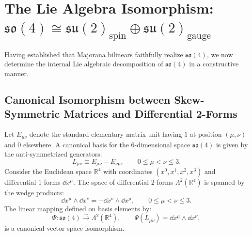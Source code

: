 \section{The Lie Algebra Isomorphism: \texorpdfstring{$\mathfrak{so}(4) \cong \mathfrak{su}(2)_{\mathrm{spin}} \oplus \mathfrak{su}(2)_{\mathrm{gauge}}$}{so(4) = su(2) + su(2)}}
\label{sec:m1_1_so4_isomorphism}

Having established that Majorana bilinears faithfully realize $\mathfrak{so}(4)$, we now determine the internal Lie algebraic decomposition of $\mathfrak{so}(4)$ in a constructive manner.

\subsection{Canonical Isomorphism between Skew-Symmetric Matrices and Differential 2-Forms}
Let $E_{\mu\nu}$ denote the standard elementary matrix unit having $1$ at position $(\mu, \nu)$ and $0$ elsewhere. A canonical basis for the 6-dimensional space $\mathfrak{so}(4)$ is given by the anti-symmetrized generators:
\begin{equation}
\label{eq:m1_1_so4_canonical_basis}
L_{\mu\nu} \equiv E_{\mu\nu} - E_{\nu\mu}, \qquad 0 \le \mu < \nu \le 3.
\end{equation}
Consider the Euclidean space $\mathbb{R}^4$ with coordinates $(x^0, x^1, x^2, x^3)$ and differential 1-forms $\dd x^\mu$. The space of differential 2-forms $\Lambda^2(\mathbb{R}^4)$ is spanned by the wedge products:
\begin{equation}
\label{eq:m1_1_2forms_basis}
\dd x^\mu \wedge \dd x^\nu = -\dd x^\nu \wedge \dd x^\mu, \qquad 0 \le \mu < \nu \le 3.
\end{equation}
The linear mapping defined on basis elements by:
\begin{equation}
\label{eq:m1_1_matrix_to_form_iso}
\Psi: \mathfrak{so}(4) \xrightarrow{\sim} \Lambda^2(\mathbb{R}^4), \qquad \Psi(L_{\mu\nu}) = \dd x^\mu \wedge \dd x^\nu,
\end{equation}
is a canonical vector space isomorphism.

